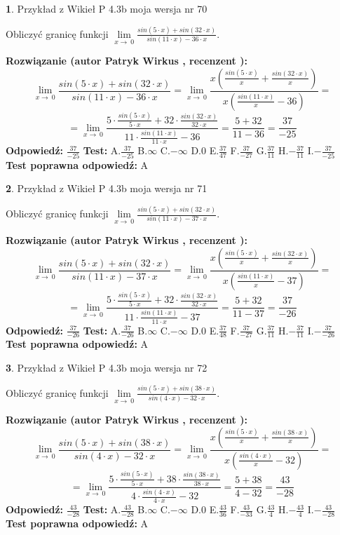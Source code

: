 \documentclass[12pt, a4paper]{article}
\theoremstyle{definition} %
\newtheorem{zad}{}
\newcommand{\zadStart}[1]{\begin{zad}#1\newline}
\newcommand{\zadStop}{\end{zad}}
\newcommand{\rozwStart}[2]{\noindent \textbf{Rozwiązanie (autor #1 , recenzent #2): }\newline}
\newcommand{\rozwStop}{\newline}
\newcommand{\odpStart}{\noindent \textbf{Odpowiedź:}\newline}
\newcommand{\odpStop}{\newline}
\newcommand{\testStart}{\noindent \textbf{Test:}\newline}
\newcommand{\testStop}{\newline}
\newcommand{\kluczStart}{\noindent \textbf{Test poprawna odpowiedź:}\newline}
\newcommand{\kluczStop}{\newline}
\begin{document}
\zadStart{Przykład z Wikieł P 4.3b moja wersja nr 70}


Obliczyć granicę funkcji $\lim\limits_{x\to\ 0}\frac{sin(5 \cdot x)+sin(32 \cdot x)}{sin(11 \cdot x)-36 \cdot x}$.
\zadStop
\rozwStart{Patryk Wirkus}{}
$$\lim\limits_{x\to\ 0}\frac{sin(5 \cdot x)+sin(32 \cdot x)}{sin(11 \cdot x)-36 \cdot x}=\lim\limits_{x\to\ 0}\frac{x(\frac{sin(5 \cdot x)}{x}+\frac{sin(32 \cdot x)}{x})}{x(\frac{sin(11 \cdot x)}{x}-36)}=$$
$$=\lim\limits_{x\to\ 0}\frac{5 \cdot \frac{sin(5 \cdot x)}{5 \cdot x}+32 \cdot \frac{sin(32 \cdot x)}{32 \cdot x}}{11 \cdot \frac{sin(11 \cdot x)}{11 \cdot x}-36}=\frac{5+32}{11-36} = \frac{37}{-25}$$
\rozwStop
\odpStart
$\frac{37}{-25}$
\odpStop
\testStart
A.$\frac{37}{-25}$
B.$\infty$
C.$-\infty$
D.$0$
E.$\frac{37}{47}$
F.$\frac{37}{-27}$
G.$\frac{37}{11}$
H.$-\frac{37}{11}$
I.$-\frac{37}{-25}$
\testStop
\kluczStart
A
\kluczStop



\zadStart{Przykład z Wikieł P 4.3b moja wersja nr 71}


Obliczyć granicę funkcji $\lim\limits_{x\to\ 0}\frac{sin(5 \cdot x)+sin(32 \cdot x)}{sin(11 \cdot x)-37 \cdot x}$.
\zadStop
\rozwStart{Patryk Wirkus}{}
$$\lim\limits_{x\to\ 0}\frac{sin(5 \cdot x)+sin(32 \cdot x)}{sin(11 \cdot x)-37 \cdot x}=\lim\limits_{x\to\ 0}\frac{x(\frac{sin(5 \cdot x)}{x}+\frac{sin(32 \cdot x)}{x})}{x(\frac{sin(11 \cdot x)}{x}-37)}=$$
$$=\lim\limits_{x\to\ 0}\frac{5 \cdot \frac{sin(5 \cdot x)}{5 \cdot x}+32 \cdot \frac{sin(32 \cdot x)}{32 \cdot x}}{11 \cdot \frac{sin(11 \cdot x)}{11 \cdot x}-37}=\frac{5+32}{11-37} = \frac{37}{-26}$$
\rozwStop
\odpStart
$\frac{37}{-26}$
\odpStop
\testStart
A.$\frac{37}{-26}$
B.$\infty$
C.$-\infty$
D.$0$
E.$\frac{37}{48}$
F.$\frac{37}{-27}$
G.$\frac{37}{11}$
H.$-\frac{37}{11}$
I.$-\frac{37}{-26}$
\testStop
\kluczStart
A
\kluczStop



\zadStart{Przykład z Wikieł P 4.3b moja wersja nr 72}


Obliczyć granicę funkcji $\lim\limits_{x\to\ 0}\frac{sin(5 \cdot x)+sin(38 \cdot x)}{sin(4 \cdot x)-32 \cdot x}$.
\zadStop
\rozwStart{Patryk Wirkus}{}
$$\lim\limits_{x\to\ 0}\frac{sin(5 \cdot x)+sin(38 \cdot x)}{sin(4 \cdot x)-32 \cdot x}=\lim\limits_{x\to\ 0}\frac{x(\frac{sin(5 \cdot x)}{x}+\frac{sin(38 \cdot x)}{x})}{x(\frac{sin(4 \cdot x)}{x}-32)}=$$
$$=\lim\limits_{x\to\ 0}\frac{5 \cdot \frac{sin(5 \cdot x)}{5 \cdot x}+38 \cdot \frac{sin(38 \cdot x)}{38 \cdot x}}{4 \cdot \frac{sin(4 \cdot x)}{4 \cdot x}-32}=\frac{5+38}{4-32} = \frac{43}{-28}$$
\rozwStop
\odpStart
$\frac{43}{-28}$
\odpStop
\testStart
A.$\frac{43}{-28}$
B.$\infty$
C.$-\infty$
D.$0$
E.$\frac{43}{36}$
F.$\frac{43}{-33}$
G.$\frac{43}{4}$
H.$-\frac{43}{4}$
I.$-\frac{43}{-28}$
\testStop
\kluczStart
A
\kluczStop
\end{document}
